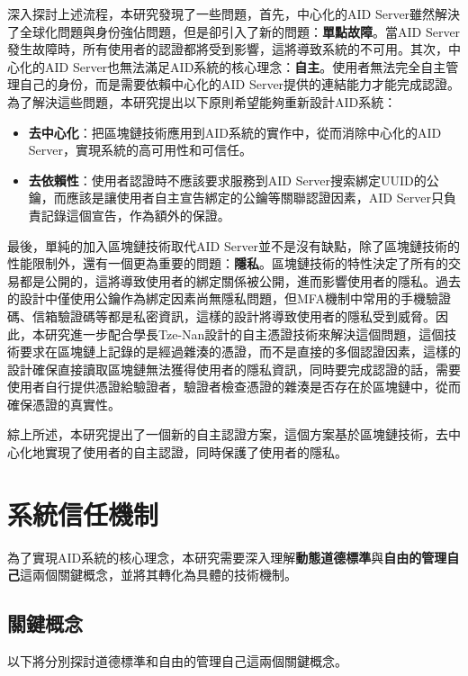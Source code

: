 深入探討上述流程，本研究發現了一些問題，首先，中心化的AID Server雖然解決了全球化問題與身份強佔問題，但是卻引入了新的問題：\textbf{單點故障}。當AID Server發生故障時，所有使用者的認證都將受到影響，這將導致系統的不可用。其次，中心化的AID Server也無法滿足AID系統的核心理念：\textbf{自主}。使用者無法完全自主管理自己的身份，而是需要依賴中心化的AID Server提供的連結能力才能完成認證。為了解決這些問題，本研究提出以下原則希望能夠重新設計AID系統：
\begin{itemize}
  \item \textbf{去中心化}：把區塊鏈技術應用到AID系統的實作中，從而消除中心化的AID Server，實現系統的高可用性和可信任。
  \item \textbf{去依賴性}：使用者認證時不應該要求服務到AID Server搜索綁定UUID的公鑰，而應該是讓使用者自主宣告綁定的公鑰等關聯認證因素，AID Server只負責記錄這個宣告，作為額外的保證。
\end{itemize}

最後，單純的加入區塊鏈技術取代AID Server並不是沒有缺點，除了區塊鏈技術的性能限制外，還有一個更為重要的問題：\textbf{隱私}。區塊鏈技術的特性決定了所有的交易都是公開的，這將導致使用者的綁定關係被公開，進而影響使用者的隱私。過去的設計中僅使用公鑰作為綁定因素尚無隱私問題，但MFA機制中常用的手機驗證碼、信箱驗證碼等都是私密資訊，這樣的設計將導致使用者的隱私受到威脅。因此，本研究進一步配合學長Tze-Nan\cite{NTU202102846}設計的自主憑證技術來解決這個問題，這個技術要求在區塊鏈上記錄的是經過雜湊的憑證，而不是直接的多個認證因素，這樣的設計確保直接讀取區塊鏈無法獲得使用者的隱私資訊，同時要完成認證的話，需要使用者自行提供憑證給驗證者，驗證者檢查憑證的雜湊是否存在於區塊鏈中，從而確保憑證的真實性。

綜上所述，本研究提出了一個新的自主認證方案，這個方案基於區塊鏈技術，去中心化地實現了使用者的自主認證，同時保護了使用者的隱私。

\section{系統信任機制}
為了實現AID系統的核心理念，本研究需要深入理解\textbf{動態道德標準}與\textbf{自由的管理自己}這兩個關鍵概念，並將其轉化為具體的技術機制。
\subsection{關鍵概念}
以下將分別探討道德標準和自由的管理自己這兩個關鍵概念。
